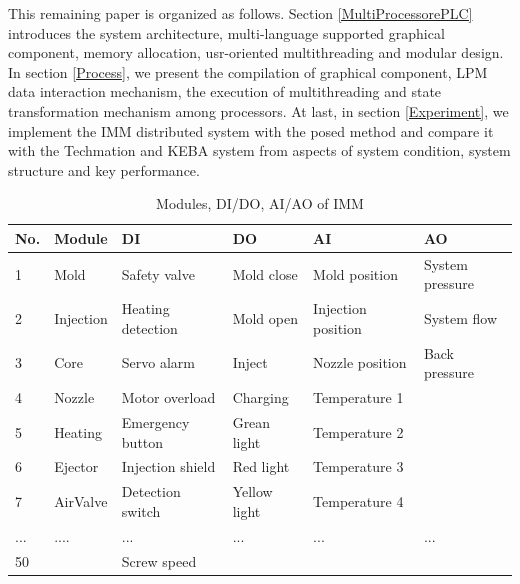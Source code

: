 \documentclass[journal,UTF8]{IEEEtran}
\begin{document}
This remaining paper is organized as follows. Section \ref{MultiProcessorePLC} introduces the system architecture, multi-language supported graphical component, memory allocation, usr-oriented multithreading and modular design. In section \ref{Process}, we present the compilation of graphical component, LPM data interaction mechanism, the execution of multithreading and state transformation mechanism among processors. At last, in section \ref{Experiment}, we implement the IMM distributed system with the posed method and compare it with the Techmation and KEBA system from aspects of system condition, system structure and key performance.
\begin{table}
	\scriptsize \caption{Modules, DI/DO, AI/AO of IMM}
	\label{table:IMMSystem}
	\begin{center}
		\renewcommand{\arraystretch}{1.4}
		\setlength\tabcolsep{3pt}
		\begin{tabular}{|p{0.3cm}|p{0.8cm}|p{1.7cm}|p{1.2cm}|p{1.7cm}|p{1.5cm}|}
			\hline
			No. & Module      & DI                       & DO           & AI                     & AO\\
			\hline
			1  & Mold       & Safety valve & Mold close     & Mold position        &System pressure \\
			\hline
			2  & Injection  & Heating detection & Mold open      & Injection position    &System flow\\
			\hline
			3  & Core      & Servo alarm         & Inject          & Nozzle position      &Back pressure\\
			\hline
			4  & Nozzle    & Motor overload            & Charging         & Temperature 1        &  \\
			\hline
			5  & Heating   & Emergency button           & Grean light       & Temperature 2        &\\
			\hline
			6  & Ejector   & Injection shield          & Red light         & Temperature 3       &\\
			\hline
			7  & AirValve & Detection switch          & Yellow light       & Temperature 4      &\\
            \hline
			...  & ....        & ...                       & ...                & ...                &...\\
            \hline
			50  &             & Screw speed                &                    &                     & \\
\hline
		\end{tabular}
	\end{center}
\end{table}
\end{document}
